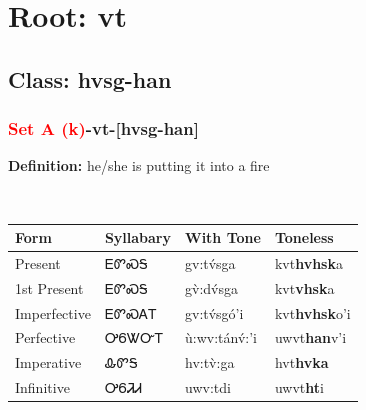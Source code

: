 \needspace{4in}
\section*{Root: vt}
\nopagebreak
{}
\needspace{3in}
\subsection*{Class: hvsg-han}
\nopagebreak
\needspace{2in}
\subsubsection*{\textcolor{Red}{Set A (k)}{-}\textbf{vt}{-}[hvsg-han]}
\nopagebreak
\textbf{Definition: } he/she is putting it into a fire
\\[0.5em]
\begin{tabularx}{\textwidth}{l X X X}%
\toprule%
\textbf{Form}&\textbf{Syllabary}&\textbf{With Tone}&\textbf{Toneless}\\%
\midrule%
Present&ᎬᏛᏍᎦ&gv:tv́sga&kvt\textbf{hvhsk}a\\%
1st Present&ᎬᏛᏍᎦ&gv̀:dv́sga&kvt\textbf{vhsk}a\\%
Imperfective&ᎬᏛᏍᎪᎢ&gv:tv́sgó’i&kvt\textbf{hvhsk}o'i\\%
Perfective&ᎤᏮᏔᏅᎢ&ù:wv:tánv́:’i&uwvt\textbf{han}v'i\\%
Imperative&ᎲᏛᎦ&hv:tv̀:ga&hvt\textbf{hvka}\\%
Infinitive&ᎤᏮᏘᏗ&uwv:tdi&uwvt\textbf{ht}i\\%
\bottomrule%
\end{tabularx}
\\[1em]